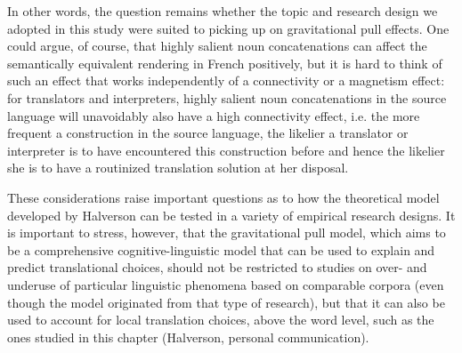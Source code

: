\documentclass[output=paper]{langscibook}
\begin{document}
In other words, the question remains whether the topic and research design we adopted in this study were suited to picking up on gravitational pull effects. One could argue, of course, that highly salient noun concatenations can affect the semantically equivalent rendering in French positively, but it is hard to think of such an effect that works independently of a connectivity or a magnetism effect: for translators and interpreters, highly salient noun concatenations in the source language will unavoidably also have a high connectivity effect, i.e. the more frequent a construction in the source language, the likelier a translator or interpreter is to have encountered this construction before and hence the likelier she is to have a routinized translation solution at her disposal.

\begin{sloppypar}
These considerations raise important questions as to how the theoretical model developed by Halverson can be tested in a variety of empirical research designs. It  is important to stress, however, that the gravitational pull model, which aims to be a comprehensive cognitive-linguistic model that can be used to explain and predict translational choices, should not be restricted to studies on over- and underuse of particular linguistic phenomena based on comparable corpora (even though the model originated from that type of research), but that it can also be used to account for local translation choices, above the word level, such as the ones studied in this chapter (Halverson, personal communication).
\end{sloppypar}
\end{document}
